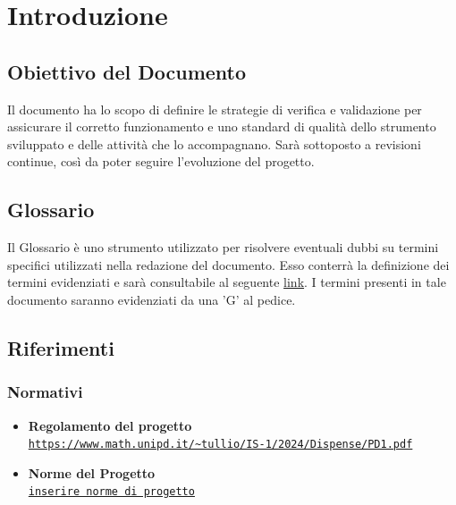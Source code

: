 \documentclass{article}
\begin{document}
\newpage
\section{Introduzione}
\subsection{Obiettivo del Documento}
Il documento ha lo scopo di definire le strategie di verifica e validazione per assicurare il corretto funzionamento e uno standard di qualità
dello strumento sviluppato e delle attività che lo accompagnano. Sarà sottoposto a revisioni continue, così da poter seguire l'evoluzione del progetto.

\subsection{Glossario}
Il Glossario è uno strumento utilizzato per risolvere eventuali dubbi su termini specifici utilizzati nella redazione del documento. Esso conterrà la definizione dei 
termini evidenziati e sarà consultabile al seguente \href{https://code7crusaders.github.io/docs/RTB/documentazione_interna/glossario.html}{link}. I termini presenti in tale documento
saranno evidenziati da una 'G' al pedice.

\subsection{Riferimenti}
\subsubsection{Normativi}
\begin{itemize}
    \item \textbf{Regolamento del progetto} \\ \texttt{\url{https://www.math.unipd.it/~tullio/IS-1/2024/Dispense/PD1.pdf}}
    \item \textbf{Norme del Progetto} \\ \texttt{\url{inserire norme di progetto}}
\end{itemize}
\end{document}
